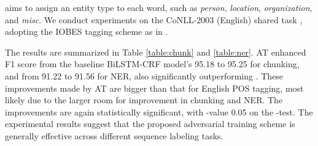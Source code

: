 \documentclass[11pt,a4paper]{article}
\begin{document}
\begin{table}[!t]
\setlength{\extrarowheight}{1pt}
\centering
{}\vspace{-1mm}

\caption{NER F1 scores on the CoNLL-2003 (English) task, with other top performing models.}
\label{table:ner}
\vspace{-4mm}
\end{table}

 aims to assign an entity type to each word, such as {\it person}, {\it location}, {\it organization}, and {\it misc}.
We conduct experiments on
the CoNLL-2003 (English) shared task \cite{tjong2003introduction}, adopting the IOBES tagging scheme as in \cite{Lample2016ner,ma-hovy:2016:P16-1}.\vspace{0.5mm}


The results are summarized in Table \ref{table:chunk} and \ref{table:ner}.
AT enhanced F1 score from the baseline BiLSTM-CRF model's 95.18 to 95.25 for chunking, and from 91.22 to 91.56 for NER, also significantly outperforming .
These improvements made by AT are bigger than that for English POS tagging, most likely due to the larger room for improvement in chunking and NER. 
The improvements are again statistically significant, with -value \scalebox{0.9}{} 0.05 on the -test. 
The experimental results suggest that the proposed adversarial training scheme is generally effective across different sequence labeling tasks. 
\end{document}
